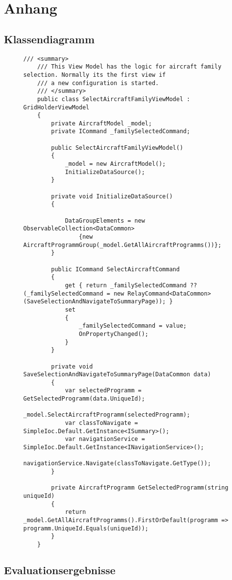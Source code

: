 \chapter{Anhang}


\section{Klassendiagramm}
\begin{figure}
\begin{lstlisting}
/// <summary>
    /// This View Model has the logic for aircraft family selection. Normally its the first view if
    /// a new configuration is started.
    /// </summary>
    public class SelectAircraftFamilyViewModel : GridHolderViewModel
    {
        private AircraftModel _model;
        private ICommand _familySelectedCommand;

        public SelectAircraftFamilyViewModel()
        {
            _model = new AircraftModel();
            InitializeDataSource();
        }

        private void InitializeDataSource()
        {

            DataGroupElements = new ObservableCollection<DataCommon>
                {new AircraftProgrammGroup(_model.GetAllAircraftProgramms())}; 
        }

        public ICommand SelectAircraftCommand
        {
            get { return _familySelectedCommand ?? (_familySelectedCommand = new RelayCommand<DataCommon>(SaveSelectionAndNavigateToSummaryPage)); }
            set
            {
                _familySelectedCommand = value;
                OnPropertyChanged();
            }
        }

        private void SaveSelectionAndNavigateToSummaryPage(DataCommon data)
        {
            var selectedProgramm = GetSelectedProgramm(data.UniqueId);
            _model.SelectAircraftProgramm(selectedProgramm);
            var classToNavigate = SimpleIoc.Default.GetInstance<ISummary>();
            var navigationService = SimpleIoc.Default.GetInstance<INavigationService>();
            navigationService.Navigate(classToNavigate.GetType());
        }

        private AircraftProgramm GetSelectedProgramm(string uniqueId)
        {
            return _model.GetAllAircraftProgramms().FirstOrDefault(programm => programm.UniqueId.Equals(uniqueId));
        }
    }
\end{lstlisting} 
\label{aircraftFamilySelectionViewModel}
\end{figure}
 
\section{Evaluationsergebnisse} \label{anhangEva}